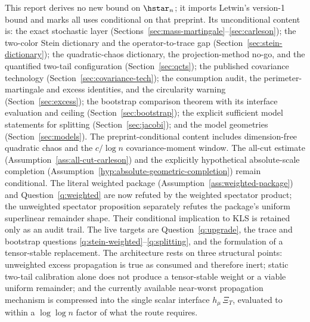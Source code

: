 \documentclass[../../main.tex]{subfiles}
\begin{document}
This report derives no new bound on $\hstar_n$; it imports Letwin's version-1 bound and marks all
uses conditional on that preprint. Its unconditional content is: the exact stochastic
layer (Sections~\ref{sec:mass-martingale}--\ref{sec:carleson}); the two-color Stein dictionary
and the operator-to-trace gap (Section~\ref{sec:stein-dictionary}); the quadratic-chaos
dictionary, the projection-method no-go, and the quantified two-tail configuration
(Section~\ref{sec:qcts}); the published covariance technology
(Section~\ref{sec:covariance-tech}); the consumption audit, the perimeter-martingale and
excess identities, and the circularity warning (Section~\ref{sec:excess}); the bootstrap
comparison theorem with its interface evaluation and ceiling (Section~\ref{sec:bootstrap}); the
explicit sufficient model statements for splitting (Section~\ref{sec:jacobi}); and the model
geometries (Section~\ref{sec:models}). The preprint-conditional content includes dimension-free
quadratic chaos and the $c/\log n$ covariance-moment window. The all-cut estimate
(Assumption~\ref{ass:all-cut-carleson}) and the explicitly hypothetical absolute-scale
completion (Assumption~\ref{hyp:absolute-geometric-completion}) remain conditional. The literal
weighted package (Assumption~\ref{ass:weighted-package}) and Question~\ref{q:weighted} are now
refuted by the weighted spectator product; the unweighted spectator proposition separately
refutes the package's uniform superlinear remainder shape. Their conditional implication to KLS
is retained only as an audit trail. The live targets are Question~\ref{q:upgrade}, the trace and bootstrap questions
\ref{q:stein-weighted}--\ref{q:splitting}, and the formulation of a tensor-stable replacement.
The architecture rests on three structural points: unweighted excess propagation is true as
consumed and therefore inert; static two-tail calibration alone does not produce a tensor-stable
weight or a viable uniform remainder; and the currently available near-worst propagation mechanism is compressed into the
single scalar interface $h_\mu\,\Xi_T$, evaluated to within a $\log\log n$ factor of what the
route requires.
\end{document}
